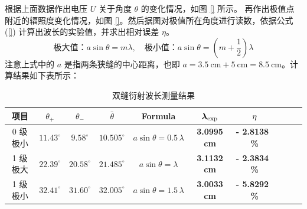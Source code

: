 \documentclass[UTF8]{article}
\theoremstyle{MyLineTheoremStyle} %
\theoremstyle{MyBlockTheoremStyle} %
\theoremstyle{MySubsubsectionStyle} %
\begin{document}
根据上面数据作出电压 $U$ 关于角度 $\theta$ 的变化情况，如图 \ref{} 所示。
再作出极值点附近的辐照度变化情况，如图 \ref{}。然后据图对极值所在角度进行读数，依据公式 (\ref{}) 计算出波长的实验值，并求出相对误差 $\eta $。
\begin{equation} 
\text{极大值：} a \sin \theta = m \lambda,\quad \text{极小值：} a \sin \theta = \left(m + \frac{1}{2}\right) \lambda
\end{equation}
注意上式中的 $a$ 是指两条狭缝的中心距离，也即 $a = 3.5 \ \mathrm{cm} + 5 \ \mathrm{cm}  = 8.5\ \mathrm{cm}$。计算结果如下表所示：
\begin{table}[H]\centering
    \caption{双缝衍射波长测量结果}
    \label{双缝衍射波长测量结果}
\begin{tabular}{cccccccccc}\toprule
    项目 & $\theta_+$ & $\theta_-$ & $\bar{\theta}$ & Formula & $\boldmath \lambda_{\text{exp}}$  & $\boldmath \eta$ \\
    \midrule
    0 级极小 & $11.43^\circ$ &  $9.58^\circ$  & $10.505^\circ$ & $a \sin \theta = 0.5\,\lambda$ & \textbf{3.0995 cm} &  \textbf{- 2.8138 \,\%}\\
    1 级极大 & $22.39^\circ$ &  $20.58^\circ$ & $21.485^\circ$ & $a \sin \theta = \lambda$      & \textbf{3.1132 cm} &  \textbf{- 2.3834 \,\%}\\
    1 级极小 & $32.41^\circ$ &  $31.60^\circ$ & $32.005^\circ$ & $a \sin \theta = 1.5\,\lambda$ & \textbf{3.0033 cm} &  \textbf{- 5.8292 \,\%}\\
    \bottomrule
\end{tabular}
\end{table}
\end{document}
